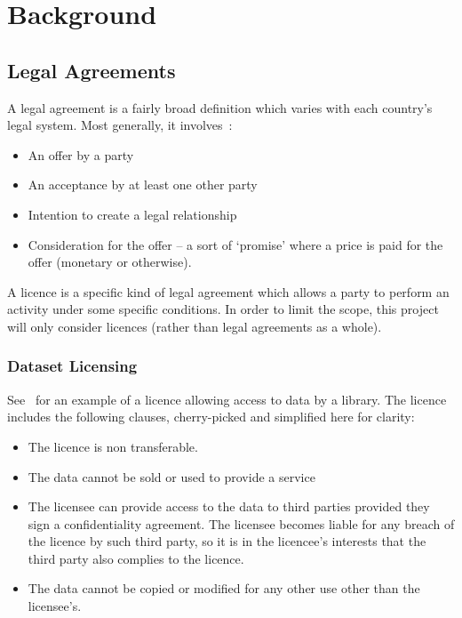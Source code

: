 \chapter{Background}\label{ch:background}


\section{Legal Agreements}\label{sec:licensing}

A legal agreement is a fairly broad definition which varies with each country's legal system.
Most generally, it involves~\cite{contractDef2018precedent}:
\begin{itemize}
    \item An offer by a party
    \item An acceptance by at least one other party
    \item Intention to create a legal relationship
    \item Consideration for the offer -- a sort of `promise' where a price is paid for the offer (monetary or
    otherwise).
\end{itemize}

A licence is a specific kind of legal agreement which allows a party to perform an activity under some specific
conditions\cite{licenseDefinition}.
In order to limit the scope, this project will only consider licences (rather than legal agreements as a whole).

\subsection{Dataset Licensing}\label{subsec:licensing:dataset}
See~\cite{seismicDataLicence} for an example of a licence allowing access to data by a library.
The licence includes the following clauses, cherry-picked and simplified here for clarity:
\begin{itemize}
    \item The licence is non transferable.
    \item The data cannot be sold or used to provide a service
    \item The licensee can provide access to the data to third parties provided they sign a confidentiality agreement.
    The licensee becomes liable for any breach of the licence by such third party, so it is in the licencee's interests
    that the third party also complies to the licence.
    \item The data cannot be copied or modified for any other use other than the licensee's.
\end{itemize}

